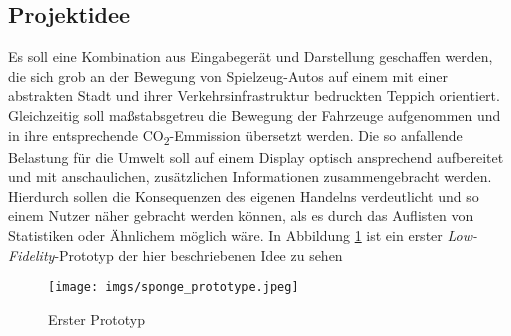 \documentclass[.../Dokumentation.tex]{subfiles}
\begin{document}
\subsection{Projektidee}\label{sec-intr-idea}
Es soll eine Kombination aus Eingabegerät und Darstellung geschaffen werden, 
die sich grob an der Bewegung von Spielzeug-Autos auf einem 
mit einer abstrakten Stadt und ihrer Verkehrsinfrastruktur bedruckten Teppich 
orientiert. Gleichzeitig soll maßstabsgetreu die Bewegung der Fahrzeuge 
aufgenommen und in ihre entsprechende CO\textsubscript{2}-Emmission übersetzt 
werden. Die so anfallende Belastung für die Umwelt soll auf einem Display 
optisch ansprechend aufbereitet und mit anschaulichen, zusätzlichen 
Informationen zusammengebracht werden. 
Hierdurch sollen die Konsequenzen des eigenen Handelns verdeutlicht 
und so einem Nutzer näher gebracht werden können, als es durch das 
Auflisten von Statistiken oder Ähnlichem möglich wäre. In Abbildung 
\ref{fig-sponge} ist ein erster \textit{Low-Fidelity}-Prototyp der hier 
beschriebenen Idee zu sehen
\begin{figure}[H]
    \begin{center}
    \texttt{[image: imgs/sponge\_prototype.jpeg]}
    \caption{Erster Prototyp}
    \label{fig-sponge}
\end{center}
\end{figure}
\end{document}
